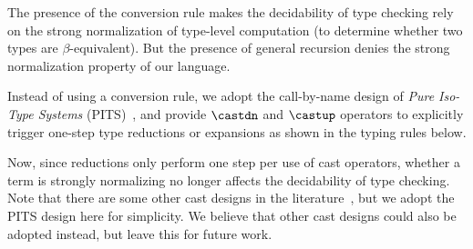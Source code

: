 \noindent The presence of the conversion rule makes the decidability of
type checking rely on the strong normalization of type-level computation
(to determine whether two types are $\beta$-equivalent).
But the presence of general recursion denies the strong normalization property
of our language.

Instead of using a conversion rule, we adopt the call-by-name design of
\emph{Pure Iso-Type Systems} (PITS)~\citep{isotype,yang2019pure},
and provide $\castdn$ and $\castup$ operators to explicitly trigger one-step
type reductions or expansions as shown in the typing rules below.

\noindent Now, since reductions only perform one step per use of cast
operators, whether a term is strongly normalizing no longer affects the
decidability of type checking.
Note that there are some other cast designs in the
literature~\citep{guru,sjoberg:msfp12, kimmel:plpv, zombie:popl15}, but
we adopt the PITS design here for simplicity. We believe that other cast
designs could also be adopted instead, but leave this for future work.
